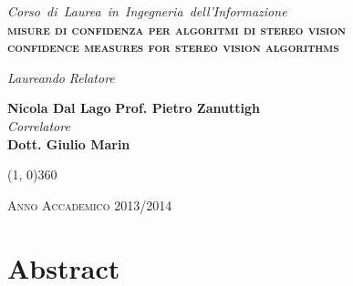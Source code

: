 \documentclass[12pt]{report}
\newcommand{\ThesisTitle}{misure di confidenza per algoritmi di stereo vision}
\newcommand{\nullpage}{\newpage\null\thispagestyle{empty}}
\begin{document}
\begin{titlepage}
\begin{center}
			\vspace{1.5cm}
			\emph{\Large{Corso~di~Laurea~in~Ingegneria~dell'Informazione}} \\
			
			\vspace{1.5cm}
			\scshape{\Large{\bfseries{\ThesisTitle}}} \\
			\vspace{0.2cm} \linespread{1} \scshape{\large{\bfseries{confidence measures for stereo vision algorithms}}}
		\end{center}

		\vfill
		\begin{normalsize}
			\begin{flushleft}
  
  				\hspace{83pt} \textit{Laureando} \hspace{142pt} \textit{Relatore}\\
  				\vspace{5pt}
  
  				\hspace{62pt} \large{\textbf{Nicola Dal Lago}} \hspace{71pt} \large{\textbf{Prof. Pietro Zanuttigh}}\\
  
  				\vspace{5pt}
  				\hspace{270pt} \textit{Correlatore}\\
  
  				\vspace{5pt}
  				\hspace{247pt} \large{\textbf{Dott. Giulio Marin}}\\
			\end{flushleft}
		\end{normalsize}

		\vfill
		\begin{center}
			\hspace{-0.2cm}
			\line(1, 0){360}

			\textsc{Anno Accademico 2013/2014}
		\end{center}
 	\end{titlepage}


	\nullpage                      %

	\chapter*{Abstract}
	\label{sec:Abstract}
	\pagestyle{fancy}
	
\end{document}
